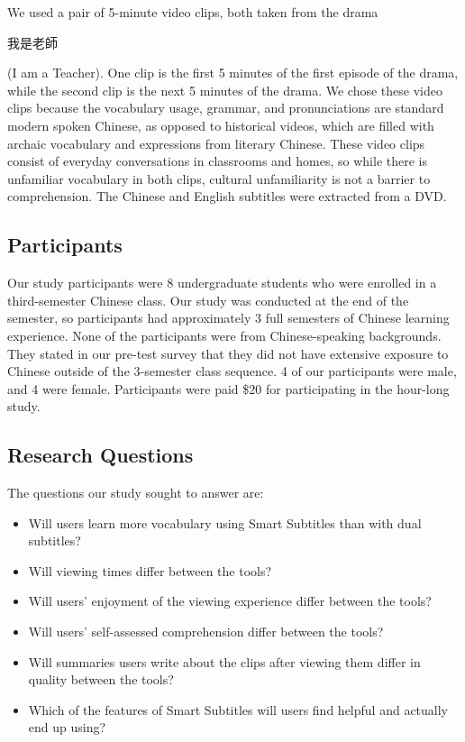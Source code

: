 \documentclass{sigchi}
\begin{document}
We used a pair of 5-minute video clips, both taken from the drama \begin{CJK}{UTF8}{min}我是老師\end{CJK} (I am a Teacher). One clip is the first 5 minutes of the first episode of the drama, while the second clip is the next 5 minutes of the drama. We chose these video clips because the vocabulary usage, grammar, and pronunciations are standard modern spoken Chinese, as opposed to historical videos, which are filled with archaic vocabulary and expressions from literary Chinese. These video clips
consist of everyday conversations in classrooms and homes,
so while there is unfamiliar vocabulary in both clips, cultural unfamiliarity is not a barrier to comprehension.
The Chinese and English subtitles were extracted from a DVD. %

\subsection{Participants}

Our study participants were 8 undergraduate students who were enrolled in a third-semester Chinese class. Our study was conducted at the end of the semester, so participants had approximately 3 full semesters of Chinese learning experience. None of the participants were from Chinese-speaking backgrounds. They stated in our pre-test survey that they did not have extensive exposure to Chinese outside of the 3-semester class sequence. 4 of our participants were male, and 4 were female.
Participants were paid \$20 for participating in the hour-long study.

\subsection{Research Questions}

The questions our study sought to answer are:

\begin{itemize}[noitemsep]
\item Will users learn more vocabulary using Smart Subtitles than with dual subtitles?
\item Will viewing times differ between the tools?
\item Will users' enjoyment of the viewing experience differ between the tools?
\item Will users' self-assessed comprehension differ between the tools?
\item Will summaries users write about the clips after viewing them differ in quality between the tools?
\item Which of the features of Smart Subtitles will users find helpful and actually end up using?
\end{itemize}
\end{document}
